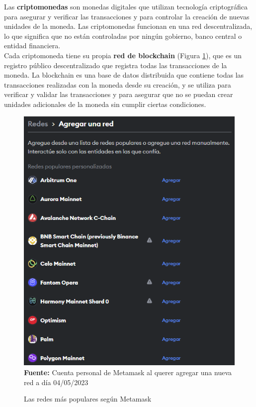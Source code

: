 \label{txt:criptomoneda}
Las \textbf{criptomonedas} son monedas digitales que utilizan tecnología 
criptográfica para asegurar y verificar las transacciones y para controlar 
la creación de nuevas unidades de la moneda. Las criptomonedas funcionan en una 
red descentralizada, lo que significa que no están controladas por ningún 
gobierno, banco central o entidad financiera.\\
\hfill \break
Cada criptomoneda tiene su propia \textbf{red de blockchain} (Figura \ref*{fig:redes}), 
que es un registro público descentralizado que registra todas las transacciones 
de la moneda. La blockchain es una base de datos distribuida que contiene 
todas las transacciones realizadas con la moneda desde su creación, y se 
utiliza para verificar y validar las transacciones y para asegurar que no 
se puedan crear unidades adicionales de la moneda sin cumplir ciertas 
condiciones.\\
\hfill \break
\begin{figure}[htb!]
    \caption{Las redes más populares según Metamask}
    \label{fig:redes}
    \centering
    \includegraphics[scale=0.75]{./Ilustraciones/redes.png}\\
    \textbf{Fuente:} Cuenta personal de Metamask al querer agregar una nueva red a día 04/05/2023
\end{figure}
